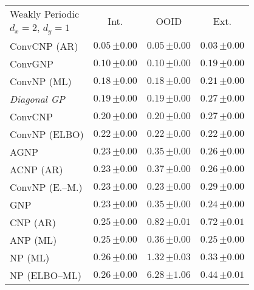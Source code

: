 \begin{tabular}[t]{lccc} 
\toprule 
Weakly Periodic & \multirow{2}{*}{Int.} & \multirow{2}{*}{OOID} & \multirow{2}{*}{Ext.} \\ 
$d_x\!=\!2,\,d_y\!=\!1$ \\ \midrule 
ConvCNP (AR) & $\mathbf{0.05}\,{ \scriptstyle \pm  0.00 }$ & $\mathbf{0.05}\,{ \scriptstyle \pm  0.00 }$ & $\mathbf{0.03}\,{ \scriptstyle \pm  0.00 }$ \\ 
ConvGNP & $0.10\,{ \scriptstyle \pm  0.00 }$ & $0.10\,{ \scriptstyle \pm  0.00 }$ & $0.19\,{ \scriptstyle \pm  0.00 }$ \\ 
ConvNP (ML) & $0.18\,{ \scriptstyle \pm  0.00 }$ & $0.18\,{ \scriptstyle \pm  0.00 }$ & $0.21\,{ \scriptstyle \pm  0.00 }$ \\ 
{\normalshape \textit{Diagonal GP}} & $0.19\,{ \scriptstyle \pm  0.00 }$ & $0.19\,{ \scriptstyle \pm  0.00 }$ & $0.27\,{ \scriptstyle \pm  0.00 }$ \\ 
ConvCNP & $0.20\,{ \scriptstyle \pm  0.00 }$ & $0.20\,{ \scriptstyle \pm  0.00 }$ & $0.27\,{ \scriptstyle \pm  0.00 }$ \\ 
ConvNP (ELBO) & $0.22\,{ \scriptstyle \pm  0.00 }$ & $0.22\,{ \scriptstyle \pm  0.00 }$ & $0.22\,{ \scriptstyle \pm  0.00 }$ \\ 
AGNP & $0.23\,{ \scriptstyle \pm  0.00 }$ & $0.35\,{ \scriptstyle \pm  0.00 }$ & $0.26\,{ \scriptstyle \pm  0.00 }$ \\ 
ACNP (AR) & $0.23\,{ \scriptstyle \pm  0.00 }$ & $0.37\,{ \scriptstyle \pm  0.00 }$ & $0.26\,{ \scriptstyle \pm  0.00 }$ \\ 
ConvNP (E.--M.) & $0.23\,{ \scriptstyle \pm  0.00 }$ & $0.23\,{ \scriptstyle \pm  0.00 }$ & $0.29\,{ \scriptstyle \pm  0.00 }$ \\ 
GNP & $0.23\,{ \scriptstyle \pm  0.00 }$ & $0.35\,{ \scriptstyle \pm  0.00 }$ & $0.24\,{ \scriptstyle \pm  0.00 }$ \\ 
CNP (AR) & $0.25\,{ \scriptstyle \pm  0.00 }$ & $0.82\,{ \scriptstyle \pm  0.01 }$ & $0.72\,{ \scriptstyle \pm  0.01 }$ \\ 
ANP (ML) & $0.25\,{ \scriptstyle \pm  0.00 }$ & $0.36\,{ \scriptstyle \pm  0.00 }$ & $0.25\,{ \scriptstyle \pm  0.00 }$ \\ 
NP (ML) & $0.26\,{ \scriptstyle \pm  0.00 }$ & $1.32\,{ \scriptstyle \pm  0.03 }$ & $0.33\,{ \scriptstyle \pm  0.00 }$ \\ 
NP (ELBO--ML) & $0.26\,{ \scriptstyle \pm  0.00 }$ & $6.28\,{ \scriptstyle \pm  1.06 }$ & $0.44\,{ \scriptstyle \pm  0.01 }$ \\ 

\end{tabular}
